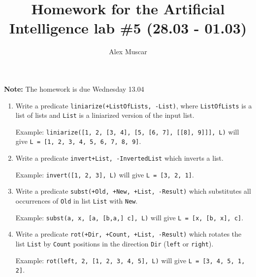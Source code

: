 \documentclass{article}
\begin{document}
\title{Homework for the Artificial Intelligence lab \#5 (28.03 - 01.03)}
\author{Alex Muscar}
\maketitle

\textbf{Note:} The homework is due Wednesday 13.04

\begin{enumerate}[1.]
\item
  Write a predicate \texttt{liniarize(+ListOfLists, -List)}, where \texttt{ListOfLists} is a list of lists and \texttt{List} is a liniarized version of the input list.

  Example: \texttt{liniarize([1, 2, [3, 4], [5, [6, 7], [[8], 9]]], L)} will give \texttt{L = [1, 2, 3, 4, 5, 6, 7, 8, 9]}.

\item
  Write a predicate \texttt{invert{+List, -InvertedList}} which inverts a list.

  Example: \texttt{invert([1, 2, 3], L)} will give \texttt{L = [3, 2, 1]}.

\item
  Write a predicate \texttt{subst(+Old, +New, +List, -Result)} which substitutes all occurrences of \texttt{Old} in list \texttt{List} with \texttt{New}.

  Example: \texttt{subst(a, x, [a, [b,a,] c], L)} will give \texttt{L = [x, [b, x], c]}.

\item
  Write a predicate \texttt{rot(+Dir, +Count, +List, -Result)} which rotates the list \texttt{List} by \texttt{Count} positions in the direction \texttt{Dir} (\texttt{left} or \texttt{right}).

  Example: \texttt{rot(left, 2, [1, 2, 3, 4, 5], L)} will give \texttt{L = [3, 4, 5, 1, 2]}.
\end{enumerate}
\end{document}
